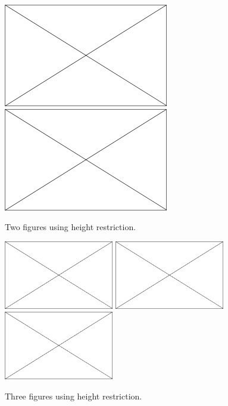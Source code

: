 \begin{figure}[H] %
	\begin{center}
		\includegraphics[height=4.5cm]{Figures/Chapter_1/placeholder} \includegraphics[height=4.5cm]{Figures/Chapter_1/placeholder} \caption{
			\label{figure_2} Two figures using height restriction.}
		\vspace{-0.5cm}
	\end{center}
\end{figure}

\begin{figure}[H] %
	\begin{center}
		\includegraphics[height=3cm]{Figures/Chapter_1/placeholder} \includegraphics[height=3cm]{Figures/Chapter_1/placeholder} \includegraphics[height=3cm]{Figures/Chapter_1/placeholder} \caption{
			\label{figure_3} Three figures using height restriction.}
		\vspace{-0.5cm}
	\end{center}
\end{figure}

